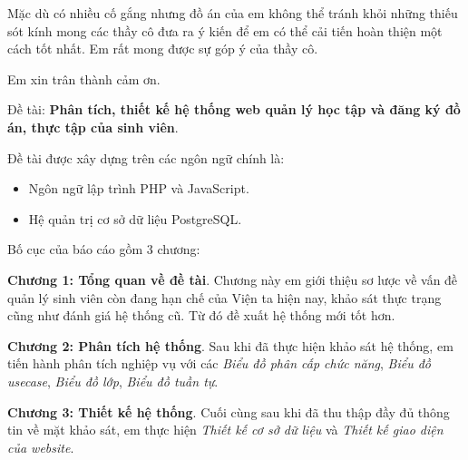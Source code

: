 Mặc dù có nhiều cố gắng nhưng đồ án của em không thể tránh khỏi những thiếu sót kính mong các thầy cô đưa ra ý kiến để em có thể cải tiến hoàn thiện một cách tốt nhất.
Em rất mong được sự góp ý của thầy cô.

Em xin trân thành cảm ơn.

\newpage
Đề tài: \textbf{Phân tích, thiết kế hệ thống web quản lý học tập và đăng ký đồ án, thực tập của sinh viên}.

Đề tài được xây dựng trên các ngôn ngữ chính là:
\begin{itemize}
  \item Ngôn ngữ lập trình PHP và JavaScript.
  \item Hệ quản trị cơ sở dữ liệu PostgreSQL.
\end{itemize}
Bố cục của báo cáo gồm 3 chương:

\textbf{Chương 1: Tổng quan về đề tài}. Chương này em giới thiệu sơ lược về vấn đề quản lý sinh viên còn đang hạn chế của Viện ta hiện nay,
khảo sát thực trạng cũng như đánh giá hệ thống cũ. Từ đó đề xuất hệ thống mới tốt hơn.

\textbf{Chương 2: Phân tích hệ thống}. Sau khi đã thực hiện khảo sát hệ thống, em tiến hành phân tích nghiệp vụ với các \textit{Biểu đồ phân cấp chức năng}, \textit{Biểu đồ usecase}, \textit{Biểu đồ lớp}, \textit{Biểu đồ tuần tự}.

\textbf{Chương 3: Thiết kế hệ thống}. Cuối cùng sau khi đã thu thập đầy đủ thông tin về mặt khảo sát, em thực hiện \textit{Thiết kế cơ sở dữ liệu} và \textit{Thiết kế giao diện của website}.
